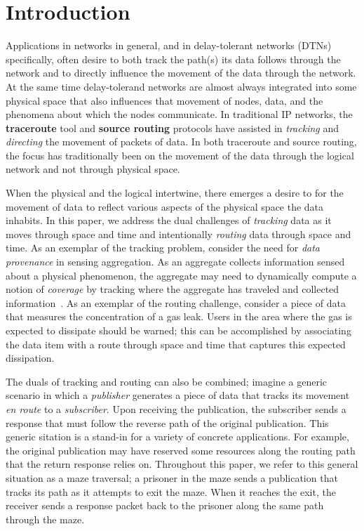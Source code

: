%
%
\section{Introduction}
Applications in networks in general, and in delay-tolerant networks (DTNs) specifically, often desire to both track the path(s) its data follows through the network and to directly influence the movement of the data through the network. At the same time delay-tolerand networks are almost always integrated into some physical space that also influences that movement of nodes, data, and the phenomena about which the nodes communicate. In traditional IP networks, the {\bf traceroute} tool and {\bf source routing} protocols have assisted in {\em tracking} and {\em directing} the movement of packets of data. In both traceroute and source routing, the focus has traditionally been on the movement of the data through the logical network and not through physical space.

When the physical and the logical intertwine, there emerges a desire to for the movement of data to reflect various aspects of the physical space the data inhabits. In this paper, we address the dual challenges of {\em tracking} data as it moves through space and time and intentionally {\em routing} data through space and time. As an exemplar of the tracking problem, consider the need for {\em data provenance} in sensing aggregation. As an aggregate collects information sensed about a physical phenomenon, the aggregate may need to dynamically compute a notion of {\em coverage} by tracking where the aggregate has traveled and collected information~\cite{michel12:spatiotemporal}. As an exemplar of the routing challenge, consider a piece of data that measures the concentration of a gas leak. Users in the area where the gas is expected to dissipate should be warned; this can be accomplished by associating the data item with a route through space and time that captures this expected dissipation. 

The duals of tracking and routing can also be combined; imagine a generic scenario in which a {\em publisher} generates a piece of data that tracks its movement {\em en route} to a {\em subscriber}. Upon receiving the publication, the subscriber sends a response that must follow the reverse path of the original publication. This generic sitation is a stand-in for a variety of concrete applications. For example, the original publication may have reserved some resources along the routing path that the return response relies on. Throughout this paper, we refer to this general situation as a maze traversal; a prisoner in the maze sends a publication that tracks its path as it attempts to exit the maze. When it reaches the exit, the receiver sends a response packet back to the prisoner along the same path through the maze.

